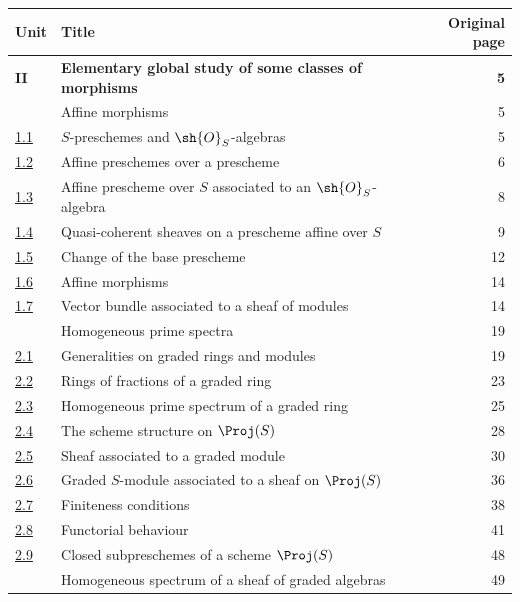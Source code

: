 \begingroup
\small
\renewcommand{\arraystretch}{1.04}
\begin{longtable}{@{}p{}p{}r@{}}
\textbf{Unit} & \textbf{Title} & \textbf{Original page}\\
\hline
\textbf{II} & \textbf{Elementary global study of some classes of
morphisms} & \textbf{5}\\
\hyperref[section:II.1]{\textsection1} & Affine morphisms & 5\\
\hyperref[subsection:II.1.1]{1.1} & $S$-preschemes and $\sh{O}_S$-algebras & 5\\
\hyperref[subsection:II.1.2]{1.2} & Affine preschemes over a prescheme & 6\\
\hyperref[subsection:II.1.3]{1.3} & Affine prescheme over $S$ associated to an
$\sh{O}_S$-algebra & 8\\
\hyperref[subsection:II.1.4]{1.4} & Quasi-coherent sheaves on a prescheme affine over $S$ & 9\\
\hyperref[subsection:II.1.5]{1.5} & Change of the base prescheme & 12\\
\hyperref[subsection:II.1.6]{1.6} & Affine morphisms & 14\\
\hyperref[subsection:II.1.7]{1.7} & Vector bundle associated to a sheaf of modules & 14\\
\hyperref[section:II.2]{\textsection2} & Homogeneous prime spectra & 19\\
\hyperref[subsection:II.2.1]{2.1} & Generalities on graded rings and modules & 19\\
\hyperref[subsection:II.2.2]{2.2} & Rings of fractions of a graded ring & 23\\
\hyperref[subsection:II.2.3]{2.3} & Homogeneous prime spectrum of a graded ring & 25\\
\hyperref[subsection:II.2.4]{2.4} & The scheme structure on $\Proj(S)$ & 28\\
\hyperref[subsection:II.2.5]{2.5} & Sheaf associated to a graded module & 30\\
\hyperref[subsection:II.2.6]{2.6} & Graded $S$-module associated to a sheaf on $\Proj(S)$ & 36\\
\hyperref[subsection:II.2.7]{2.7} & Finiteness conditions & 38\\
\hyperref[subsection:II.2.8]{2.8} & Functorial behaviour & 41\\
\hyperref[subsection:II.2.9]{2.9} & Closed subpreschemes of a scheme $\Proj(S)$ & 48\\
\hyperref[section:II.3]{\textsection3} & Homogeneous spectrum of a sheaf of graded algebras & 49\\

\end{longtable}
